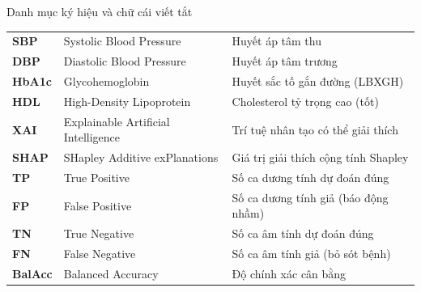 \documentclass{uetgraduation}
\begin{document}
\begin{contentlisting}
\begin{contentlistingsection}{Danh mục ký hiệu và chữ cái viết tắt}
\begin{longtable}{p{2.0cm} p{6.4cm} p{6.4cm}}
\textbf{SBP}    & Systolic Blood Pressure & Huyết áp tâm thu \\
\textbf{DBP}    & Diastolic Blood Pressure & Huyết áp tâm trương \\
\textbf{HbA1c}  & Glycohemoglobin & Huyết sắc tố gắn đường (LBXGH) \\
\textbf{HDL}    & High-Density Lipoprotein & Cholesterol tỷ trọng cao (tốt) \\
\textbf{XAI}    & Explainable Artificial Intelligence & Trí tuệ nhân tạo có thể giải thích \\
\textbf{SHAP}   & SHapley Additive exPlanations & Giá trị giải thích cộng tính Shapley \\
\textbf{TP}     & True Positive & Số ca dương tính dự đoán đúng \\
\textbf{FP}     & False Positive & Số ca dương tính giả (báo động nhầm) \\
\textbf{TN}     & True Negative & Số ca âm tính dự đoán đúng \\
\textbf{FN}     & False Negative & Số ca âm tính giả (bỏ sót bệnh) \\
\textbf{BalAcc} & Balanced Accuracy & Độ chính xác cân bằng \\
\end{longtable}
\end{contentlistingsection}
\end{contentlisting}






\end{document}
